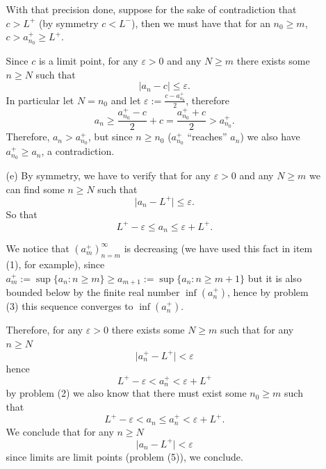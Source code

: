 \documentclass{article}
\theoremstyle{remark}
\begin{document}
\begin{enumerate}
\begin{enumerate}
            With that precision done, suppose for the sake of contradiction that $c > L^+$ (by symmetry $c < L^-$), then we must have that for an $n_0 \geq m$,
            $c > a_{n_0}^{+} \geq L^+$. 

            Since $c$ is a limit point, for any $\varepsilon>0$ and any $N \geq m$ there exists 
            some $n \geq N$ such that
            \[
            \vert a_n - c \vert \leq \varepsilon.
            \]
            In particular let $N = n_0$ and let $\varepsilon := \frac{c - a_{n_0}^+}{2}$, therefore 
            \[
            a_n \geq \frac{a_{n_0}^+ - c}{2} + c = \frac{a_{n_0}^+ + c}{2} > a_{n_0}^+.
            \]
            Therefore, $a_{n} > a_{n_0}^+$, but since $n \geq n_0$ ($a_{n_0}^+$ ``reaches'' $a_n$) we also have $a_{n_0}^+ \geq a_{n}$,
            a contradiction.
            
            \item[(e)] By symmetry, we have to verify that for any $\varepsilon > 0$ and any $N \geq m$ we can 
            find some $n\geq N$ such that
            \[
            \vert a_n - L^+ \vert \leq \varepsilon.
            \]
            So that 
            \[
            L^+ - \varepsilon \leq a_{n} \leq \varepsilon + L^+.
            \]
            
            We notice that $(a_m^+)_{n=m}^{\infty}$ is decreasing (we have used this fact in item (1), for example), since $a_m^+ := \sup\{a_n: n\geq m\} \geq a_{m+1} := \sup\{a_n: n \geq m+1\}$
            but it is also bounded below by the finite real number $\inf(a_n^+)$, hence by problem (3) this 
            sequence converges to $\inf(a_n^+)$.

            Therefore, for any $\varepsilon>0$ there exists some $N \geq m$ such that
            for any $n \geq N$
            \[
            \vert a_n^+ - L^+ \vert < \varepsilon
            \]
            hence
            \[
            L^+ - \varepsilon < a_n^+ < \varepsilon + L^+
            \]
            by problem (2) we also know that there must exist some $n_0 \geq m$ such that 
            \[
            L^+ - \varepsilon < a_n \leq a_n^+ < \varepsilon + L^+.
            \]
            We conclude that for any $n \geq N$
            \[
            \vert a_n - L^+ \vert < \varepsilon
            \]
            since limits are limit points (problem (5)), we conclude.


\end{enumerate}
\end{enumerate}
\end{document}
